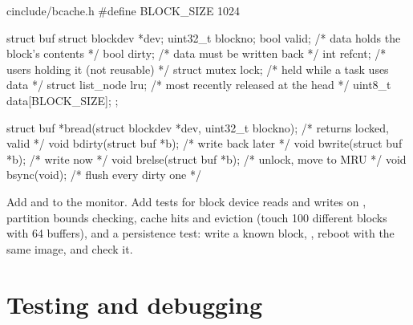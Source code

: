 \documentclass[11pt,a4paper]{article}
\begin{document}
\begin{lst}{c}{include/bcache.h}
#define BLOCK_SIZE 1024

struct buf {
    struct blockdev *dev;
    uint32_t         blockno;
    bool             valid;             /* data holds the block's contents    */
    bool             dirty;             /* data must be written back          */
    int              refcnt;            /* users holding it (not reusable)    */
    struct mutex     lock;              /* held while a task uses data        */
    struct list_node lru;               /* most recently released at the head */
    uint8_t          data[BLOCK_SIZE];
};

struct buf *bread(struct blockdev *dev, uint32_t blockno);   /* returns locked, valid */
void        bdirty(struct buf *b);                            /* write back later       */
void        bwrite(struct buf *b);                            /* write now              */
void        brelse(struct buf *b);                            /* unlock, move to MRU    */
void        bsync(void);                                      /* flush every dirty one  */
\end{lst}

Add  and  to the monitor. Add tests for block device reads and writes on
, partition bounds checking, cache hits and eviction (touch 100 different blocks with 64 buffers), and a
persistence test: write a known block, , reboot with the same image, and check it.

\section{Testing and debugging}
\end{document}

